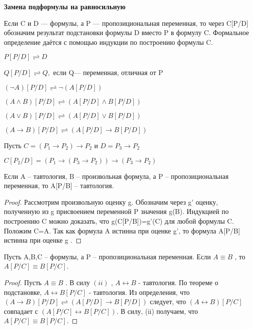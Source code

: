 \begin{center}
	\textbf{Замена подформулы на равносильную}
\end{center}
{ Если C и D — формулы, а P — пропозициональная
переменная, то через C[P/D] обозначим результат подстановки формулы D вместо P в формулу C.
Формальное определение даётся с помощью индукции по построению
формулы C.
}
\begin{center}
	{

	}
	$P[P / D] \rightleftharpoons D$ {

	}
	$Q[P / D] \rightleftharpoons Q,$ если Q— переменная, отличная от P {

	}
	$(\neg A)[P / D] \rightleftharpoons \neg(A[P / D]) $ {

	}
	$(A \wedge B)[P / D] \rightleftharpoons(A[P / D] \wedge B[P / D])$ {

	}
	$(A \vee B)[P / D] \rightleftharpoons(A[P / D] \vee B[P / D])$ {

	}
	$(A \rightarrow B)[P / D] \rightleftharpoons(A[P / D] \rightarrow B[P / D])${

	}

\end{center}

\begin{example}
	Пусть $C=\left(P_{1} \rightarrow P_{2}\right) \rightarrow P_{2} $ и $D=P_{3} \rightarrow P_{2}$
	{

	}
	$C\left[P_{2} / D\right]=\left(P_{1} \rightarrow\left(P_{3} \rightarrow P_{2}\right)\right)
	\rightarrow\left(P_{3} \rightarrow P_{2}\right)  $

\end{example}


\begin{theorem}[О подставновке]
	Если A -- тавтология, B -- произвольная формула, а P -- пропозициональная переменная, то A[P/B] -- тавтология.
\end{theorem}
\begin{proof}
	Рассмотрим произвольную оценку g. Обозначим через g' оценку, полученную из g присвоением переменной P значения
	g(B). Индукцией по построению C можно доказать, что
	g(C[P/B])=g'(C)  для любой формулы C. Положим C=A. Так как формула A истинна при оценке g', то формула A[P/B]
	истинна при оценке g .
\end{proof}

\begin{theorem}
	Пусть A,B,C -- формулы, а P -- пропозициональная
	переменная. Если ${A}\equiv{B}$ , то $A[P/C] \equiv B[P/C]$.
\end{theorem}
\begin{proof}
	Пусть $ {A}\equiv{B} $ . В силу $(ii)$ ,  ${A}\leftrightarrow{B}$  - тавтология. По теореме о подстановке,
	${A}\leftrightarrow{B}[P/C]$ - тавтология.
	Из определения, что $(A \rightarrow B)[P / D] \rightleftharpoons(A[P / D] \rightarrow B[P / D])$  следует, что
	$(A \leftrightarrow B)[P / C] $ совпадает с 
	$(A[P / C] \leftrightarrow B[P / C])$. В силу, (ii) получаем, что $A[P/C] \equiv B[P/C]$.
\end{proof}


